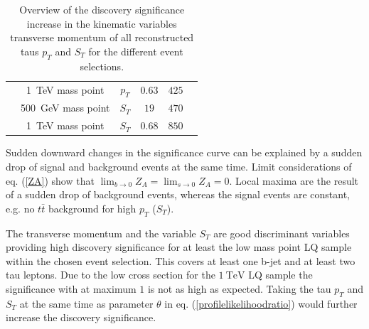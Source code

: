 \begin{table}[htbp]
\begin{tabular*}{\linewidth}{@{\extracolsep{\fill}}cccccc}
		\\
                &\SI{1}{\tera\electronvolt} mass point  &       $p_T$   & $0.63$        & $425$
                \\
                &\SI{500}{\giga\electronvolt} mass point  &       $S_T$   & $19$        & $470$
                \\
                &\SI{1}{\tera\electronvolt} mass point  &       $S_T$   & $0.68$        & $850$
                \\
                \hline
		\hline
		\end{tabular*}
		\caption[Overview of the discovery significance increase in the kinematic variables $p_T$ and $S_T$ for the different event selections.]{Overview of the discovery significance increase in the kinematic variables transverse momentum of all reconstructed taus $p_T$ and $S_T$ for the different event selections. }
		\label{xcuts}
                \renewcommand{\arraystretch}{1}
                \end{table}
%
Sudden downward changes in the significance curve can be explained by a sudden drop of signal and background events at the same time. Limit considerations of eq. (\ref{ZA}) show that $\lim_{b\rightarrow 0}Z_A=\lim_{s\rightarrow 0}Z_A=0$. Local maxima are the result of a sudden drop of background events, whereas the signal events are constant, e.g. no $t\bar{t}$ background for high $p_T$ ($S_T$).\par
The transverse momentum and the variable $S_T$ are good discriminant variables providing high discovery significance for at least the low mass point LQ sample within the chosen event selection. This covers at least one b-jet and at least two tau leptons. Due to the low cross section for the $\SI{1}{\tera\electronvolt}$ LQ sample the significance with at maximum $1$ is not as high as expected. Taking the tau $p_T$ and $S_T$ at the same time as parameter $\theta$ in eq. (\ref{profilelikelihoodratio}) would further increase the discovery significance.
